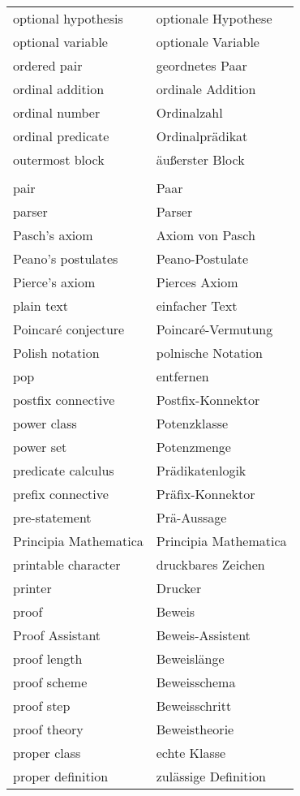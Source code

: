 \begin{longtabu}   { @{} X[l] X[l] }
    optional hypothesis & optionale Hypothese \\
    optional variable & optionale Variable \\
    ordered pair & geordnetes Paar \\
    ordinal addition & ordinale Addition \\
    ordinal number & Ordinalzahl \\
    ordinal predicate & Ordinalprädikat \\
    outermost block & äußerster Block \\
     & \\
    pair & Paar \\
    parser & Parser \\
    Pasch's axiom & Axiom von Pasch \\
    Peano's postulates & Peano-Postulate \\
    Pierce's axiom & Pierces Axiom \\
    plain text & einfacher Text \\
    Poincaré conjecture & Poincaré-Vermutung \\
    Polish notation & polnische Notation \\
    pop & entfernen \\
    postfix connective & Postfix-Konnektor \\
    power class & Potenzklasse \\
    power set & Potenzmenge \\
    predicate calculus & Prädikatenlogik \\
    prefix connective & Präfix-Konnektor \\
    pre-statement & Prä-Aussage \\
    Principia Mathematica & Principia Mathematica \\
    printable character & druckbares Zeichen \\
    printer & Drucker \\
    proof & Beweis \\
    Proof Assistant & Beweis-Assistent \\
    proof length & Beweislänge \\
    proof scheme & Beweisschema \\
    proof step & Beweisschritt \\
    proof theory & Beweistheorie \\
    proper class & echte Klasse \\
    proper definition & zulässige Definition \\

\end{longtabu}
